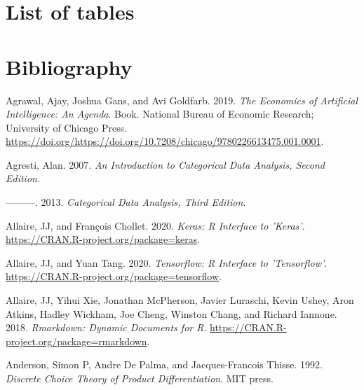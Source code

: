 \documentclass[12pt,]{article}
\begin{document}
\renewcommand\listfigurename{}
\vspace{-12mm}
\listoffigures

\newpage

\hypertarget{list-of-tables}{%
\section*{List of tables}\label{list-of-tables}}

\renewcommand\listtablename{}
\vspace{-12mm}
\listoftables

\newpage

\hypertarget{bibliography}{%
\section*{Bibliography}\label{bibliography}}

\hypertarget{refs}{}
\leavevmode\hypertarget{ref-agrawal2019nber}{}%
Agrawal, Ajay, Joshua Gans, and Avi Goldfarb. 2019. \emph{The Economics
of Artificial Intelligence: An Agenda}. Book. National Bureau of
Economic Research; University of Chicago Press.
\url{https://doi.org/https://doi.org/10.7208/chicago/9780226613475.001.0001}.

\leavevmode\hypertarget{ref-agresti2007cd}{}%
Agresti, Alan. 2007. \emph{An Introduction to Categorical Data Analysis,
Second Edition}.

\leavevmode\hypertarget{ref-agresti2013cd}{}%
---------. 2013. \emph{Categorical Data Analysis, Third Edition}.

\leavevmode\hypertarget{ref-R-keras}{}%
Allaire, JJ, and François Chollet. 2020. \emph{Keras: R Interface to
'Keras'}. \url{https://CRAN.R-project.org/package=keras}.

\leavevmode\hypertarget{ref-R-tensorflow}{}%
Allaire, JJ, and Yuan Tang. 2020. \emph{Tensorflow: R Interface to
'Tensorflow'}. \url{https://CRAN.R-project.org/package=tensorflow}.

\leavevmode\hypertarget{ref-R-rmarkdown}{}%
Allaire, JJ, Yihui Xie, Jonathan McPherson, Javier Luraschi, Kevin
Ushey, Aron Atkins, Hadley Wickham, Joe Cheng, Winston Chang, and
Richard Iannone. 2018. \emph{Rmarkdown: Dynamic Documents for R}.
\url{https://CRAN.R-project.org/package=rmarkdown}.

\leavevmode\hypertarget{ref-anderson1992discrete}{}%
Anderson, Simon P, Andre De Palma, and Jacques-Francois Thisse. 1992.
\emph{Discrete Choice Theory of Product Differentiation}. MIT press.
\end{document}
